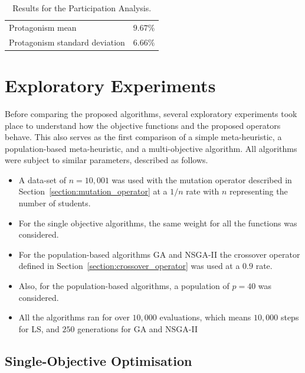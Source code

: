 \begin{table}[H]
    \centering
    \begin{tabular}{ll}
    \hline
    Protagonism mean               & $9.67\%$ \\
    Protagonism standard deviation & $6.66\%$ \\
    \hline
    \end{tabular}
    \caption{Results for the Participation Analysis.}
    \label{table:participation_results}
\end{table}

\section{Exploratory Experiments}

Before comparing the proposed algorithms, several exploratory experiments took place to understand how the objective functions and the proposed operators behave. This also serves as the first comparison of a simple meta-heuristic, a population-based meta-heuristic, and a multi-objective algorithm. All algorithms were subject to similar parameters, described as follows.\\

\begin{itemize}
    \item A data-set of $n=10,001$ was used with the mutation operator described in Section~\ref{section:mutation_operator} at a $1/n$ rate with $n$ representing the number of students.

    \item For the single objective algorithms, the same weight for all the functions was considered.
    
    \item For the population-based algorithms GA and NSGA-II the crossover operator defined in Section~\ref{section:crossover_operator} was used at a $0.9$ rate.

    \item Also, for the population-based algorithms, a population of $p=40$ was considered. 
    
    \item All the algorithms ran for over $10,000$ evaluations, which means $10,000$ steps for LS, and $250$ generations for GA and NSGA-II
\end{itemize}

\subsection{Single-Objective Optimisation}

